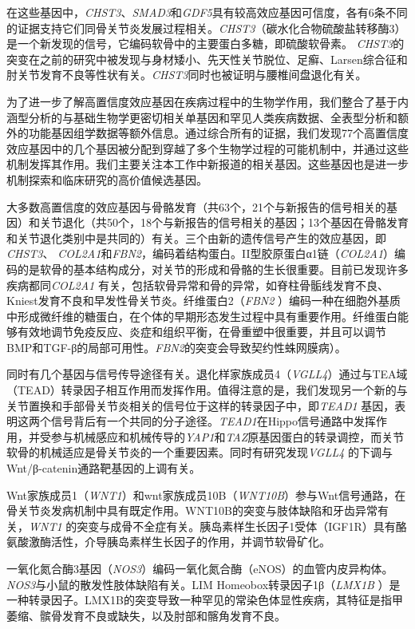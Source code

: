 在这些基因中，\emph{CHST3}、\emph{SMAD3}和\emph{GDF5}具有较高效应基因可信度，各有6条不同的证据支持它们同骨关节炎发展过程相关。\emph{CHST3}（碳水化合物硫酸盐转移酶3）是一个新发现的信号，它编码软骨中的主要蛋白多糖，即硫酸软骨素。\emph{
CHST3}的突变在之前的研究中被发现与身材矮小、先天性关节脱位、足癣、Larsen综合征和肘关节发育不良等性状有关。\emph{CHST3}同时也被证明与腰椎间盘退化有关。

为了进一步了解高置信度效应基因在疾病过程中的生物学作用，我们整合了基于内涵型分析的与基础生物学更密切相关单基因和罕见人类疾病数据、全表型分析和额外的功能基因组学数据等额外信息。通过综合所有的证据，我们发现77个高置信度效应基因中的几个基因被分配到穿越了多个生物学过程的可能机制中，并通过这些机制发挥其作用。我们主要关注本工作中新报道的相关基因。这些基因也是进一步机制探索和临床研究的高价值候选基因。

大多数高置信度的效应基因与骨骼发育（共63个，21个与新报告的信号相关的基因）和关节退化（共50个，18个与新报告的信号相关的基因；13个基因在骨骼发育和关节退化类别中是共同的）有关。三个由新的遗传信号产生的效应基因，即\emph{CHST3}、\emph{
COL2A1}和\emph{FBN2}，编码着结构蛋白。II型胶原蛋白α1链（\emph{COL2A1}）编码的是软骨的基本结构成分，对关节的形成和骨骼的生长很重要。目前已发现许多疾病都同\emph{COL2A1}
有关，包括软骨异常和骨的异常，如脊柱骨骺线发育不良、Kniest发育不良和早发性骨关节炎。纤维蛋白2（\emph{FBN2}
）编码一种在细胞外基质中形成微纤维的糖蛋白，在个体的早期形态发生过程中具有重要作用。纤维蛋白能够有效地调节免疫反应、炎症和组织平衡，在骨重塑中很重要，并且可以调节BMP和TGF-β的局部可用性。\emph{FBN2}的突变会导致契约性蛛网膜病）。

同时有几个基因与信号传导途径有关。退化样家族成员4（\emph{VGLL4}）通过与TEA域（TEAD）转录因子相互作用而发挥作用。值得注意的是，我们发现另一个新的与关节置换和手部骨关节炎相关的信号位于这样的转录因子中，即\emph{TEAD1}
基因，表明这两个信号背后有一个共同的分子途径。\emph{TEAD1}在Hippo信号通路中发挥作用，并受参与机械感应和机械传导的\emph{YAP1}和\emph{TAZ}原基因蛋白的转录调控，而关节软骨的机械适应是骨关节炎的一个重要因素。同时有研究发现\emph{VGLL4}
的下调与Wnt/β-catenin通路靶基因的上调有关。

Wnt家族成员1（\emph{WNT1}）和wnt家族成员10B（\emph{WNT10B}）参与Wnt信号通路，在骨关节炎发病机制中具有既定作用。WNT10B的突变与肢体缺陷和牙齿异常有关，\emph{WNT1}
的突变与成骨不全症有关。胰岛素样生长因子1受体（IGF1R）具有酪氨酸激酶活性，介导胰岛素样生长因子的作用，并调节软骨矿化。

一氧化氮合酶3基因（\emph{NOS3}）编码一氧化氮合酶（eNOS）的血管内皮异构体。\emph{NOS3}与小鼠的散发性肢体缺陷有关。LIM
Homeobox转录因子1β（\emph{LMX1B}
）是一种转录因子。LMX1B的突变导致一种罕见的常染色体显性疾病，其特征是指甲萎缩、髌骨发育不良或缺失，以及肘部和髂角发育不良。

